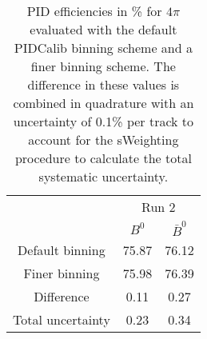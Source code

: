 \begin{table}
    \centering
    \begin{tabular}{ccc}
    \toprule
& \multicolumn{2}{c}{Run 2}\\
& $B^0$ & $\bar{B}^0$\\
    \midrule
Default binning & 75.87 & 76.12\\
Finer binning & 75.98 & 76.39\\
Difference & 0.11 & 0.27\\
Total uncertainty & 0.23 & 0.34\\
    \bottomrule
    \end{tabular}
    \caption{PID efficiencies in \% for $4\pi$ evaluated with the default PIDCalib binning scheme and a finer binning scheme. The difference in these values is combined in quadrature with an uncertainty of 0.1\% per track to account for the sWeighting procedure to calculate the total systematic uncertainty.}
\label{tab:final_PID_pipipipi}
\end{table}
